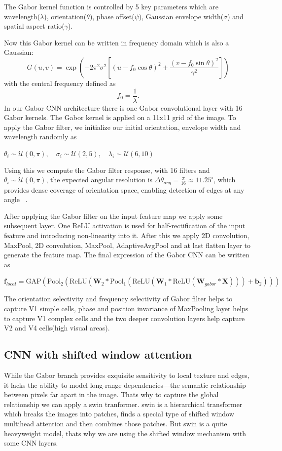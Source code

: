 \documentclass[12pt]{article}
\begin{document}
The Gabor kernel function is controlled by 5 key parameters which are wavelength($\lambda$), orientation($\theta$), phase offset($\psi$), Gaussian envelope width($\sigma$) and spatial aspect ratio($\gamma$).

Now this Gabor kernel can be written in frequency domain which is also a Gaussian:
\[
G(u, v)
=
\exp\!\left(
- 2 \pi^2 \sigma^2
\left[
(u - f_0 \cos\theta)^2
+ \frac{(v - f_0 \sin\theta)^2}{\gamma^2}
\right]
\right)
\]
with the central frequency defined as
\[
f_0 = \frac{1}{\lambda}.
\]
In our Gabor CNN architecture there is one Gabor convolutional layer with 16 Gabor kernels. The Gabor kernel is applied on a 11x11 grid of the image. To apply the Gabor filter, we initialize our initial orientation, envelope width and wavelength randomly as 

$\theta_i \sim \mathcal{U}(0, \pi), \quad
 \sigma_i \sim \mathcal{U}(2, 5), \quad
 \lambda_i \sim \mathcal{U}(6, 10)$

Using this we compute the Gabor filter response, with 16 filters and $\theta_i \sim \mathcal{U}(0, \pi)$, the expected angular resolution is
$\Delta \theta_{avg} = \frac{\pi}{16} \approx 11.25^\circ$, which provides dense coverage of orientation space, enabling detection of edges at any angle ~\cite{b2}.

After applying the Gabor filter on the input feature map we apply some subsequent layer. One ReLU activation is used for half-rectification of the input feature and introducing non-linearity into it. After this we apply 2D convolution, MaxPool, 2D convolution, MaxPool, AdaptiveAvgPool and at last flatten layer to generate the feature map. The final expression of the Gabor CNN can be written as

$\mathbf{f}_{local}
= \mathrm{GAP}(\mathrm{Pool}_2(\mathrm{ReLU}(\mathbf{W}_2 * \mathrm{Pool}_1(\mathrm{ReLU}(\mathbf{W}_1 * \mathrm{ReLU}(\mathbf{W}_{gabor} * \mathbf{X}))) + \mathbf{b}_2)))$

The orientation selectivity and frequency selectivity of Gabor filter helps to capture V1 simple cells, phase and position invariance of MaxPooling layer helps to capture V1 complex cells and the two deeper convolution layers help capture V2 and V4 cells(high visual areas). ~\cite{b3}


\subsection{CNN with shifted window attention}

While the Gabor branch provides exquisite sensitivity to local texture and edges, it lacks the ability to model long-range dependencies—the semantic relationship between pixels far apart in the image. Thats why to capture the global relationship we can apply a swin tranformer. swin is a hierarchical transformer which breaks the images into patches, finds a special type of shifted window multihead attention and then combines those patches. But swin is a quite heavyweight model, thats why we are using the shifted window mechanism with some CNN layers. 
\end{document}
